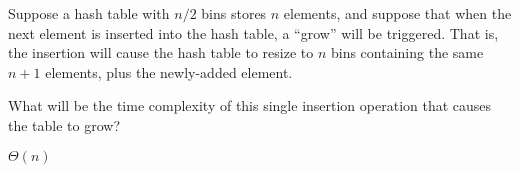 \begin{prob}
    Suppose a hash table with $n/2$ bins stores $n$ elements, and suppose that when the
    next element is inserted into the hash table, a ``grow'' will be triggered. That is,
    the insertion will cause the hash table to resize to $n$ bins containing the same
    $n + 1$ elements, plus the newly-added element.

    What will be the time complexity of this single insertion operation that causes
    the table to grow?

    \begin{soln}
        $\Theta(n)$
    \end{soln}

\end{prob}

